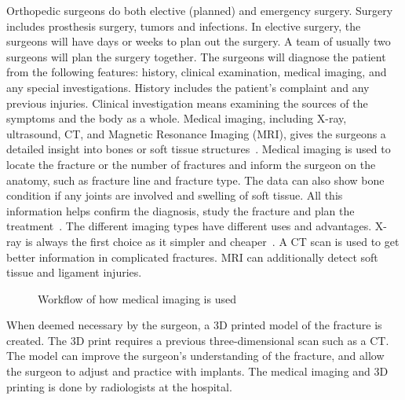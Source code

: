 \documentclass[a4paper]{report}
\begin{document}
Orthopedic surgeons do both elective (planned) and emergency surgery. Surgery includes prosthesis surgery, tumors and infections.
In elective surgery, the surgeons will have days or weeks to plan out the surgery. A team of usually two surgeons will plan the surgery together.
The surgeons will diagnose the patient from the following features: history, clinical examination, medical imaging, and any special investigations. History includes the patient's complaint and any previous injuries. Clinical investigation means examining the sources of the symptoms and the body as a whole. Medical imaging, including X-ray, ultrasound, CT, and Magnetic Resonance Imaging (MRI), gives the surgeons a detailed insight into bones or soft tissue structures~\cite{swiontkowski_manual_2013}.
Medical imaging is used to locate the fracture or the number of fractures and inform the surgeon on the anatomy, such as fracture line and fracture type. 
The data can also show bone condition if any joints are involved and swelling of soft tissue. All this information helps confirm the diagnosis, study the fracture and plan the treatment~\cite{ebnezar_textbook_2016}.
The different imaging types have different uses and advantages.
X-ray is always the first choice as it simpler and cheaper~\cite{ebnezar_textbook_2016}.
A CT scan is used to get better information in complicated fractures. MRI can additionally detect soft tissue and ligament injuries.

\begin{figure}[h!]
    \centering
	\hfill
  \caption{Workflow of how medical imaging is used}
  \label{flow}
  \small
\end{figure}

When deemed necessary by the surgeon, a 3D printed model of the fracture is created. The 3D print requires a previous three-dimensional scan such as a CT. The model can improve the surgeon's understanding of the fracture, and allow the surgeon to adjust and practice with implants. The medical imaging and 3D printing is done by radiologists at the hospital.
\end{document}
